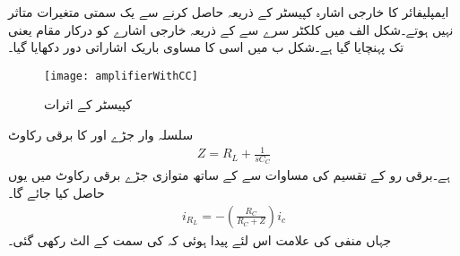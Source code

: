 


ایمپلیفائر کا خارجی اشارہ کپیسٹر  کے ذریعہ حاصل کرنے سے یک سمتی متغیرات متاثر نہیں ہوتے۔شکل  الف میں کلکٹر  سرے سے  کے ذریعہ خارجی اشارے کو درکار مقام یعنی  تک پہنچایا گیا ہے۔شکل  ب میں اسی کا مساوی باریک اشاراتی دور دکھایا گیا۔
\begin{figure}
\centering
\texttt{[image: amplifierWithCC]}
\caption{کپیسٹر  کے اثرات}
\label{شکل_محاصل_کپیسٹر_کے_اثرات}
\end{figure}
سلسلہ وار جڑے  اور  کا برقی رکاوٹ 
\begin{align*}
Z=R_L+\frac{1}{s C_C}
\end{align*}
ہے۔برقی رو کے تقسیم کی مساوات سے  کے ساتھ متوازی جڑے برقی رکاوٹ  میں    یوں حاصل کیا جائے گا۔
\begin{align*}
i_{R_L}=-\left( \frac{R_C }{R_C+Z} \right) i_c
\end{align*}
جہاں منفی کی علامت اس لئے پیدا ہوئی کہ   کی سمت  کے الٹ رکھی گئی۔
	

